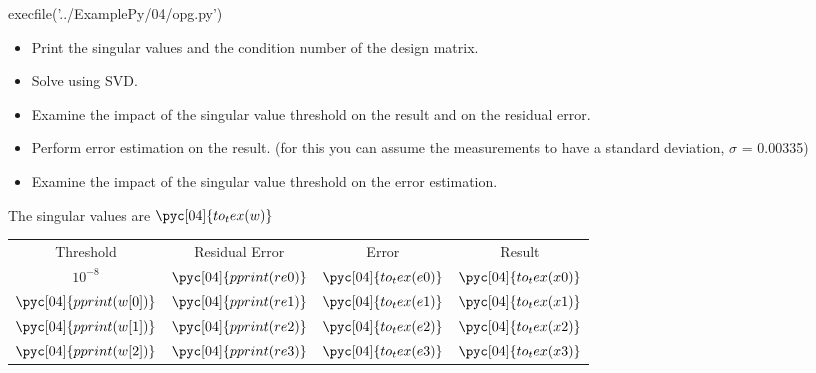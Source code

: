 \documentclass[../main.tex]{subfiles}
\begin{document}
\begin{pycode}[04]
execfile('../ExamplePy/04/opg.py')
\end{pycode}

\begin{itemize}
	\item  Print the singular values and the condition number of the design matrix.
	\item  Solve using SVD.
	\item  Examine the impact of the singular value threshold on the result and on the residual error.
	\item  Perform error estimation on the result. (for this you can assume the measurements to
		have a standard deviation, $\sigma$ = 0.00335)
	\item  Examine the impact of the singular value threshold on the error estimation.
\end{itemize}

The singular values are $\pyc[04]{to_tex(w)}$\\

\begin{tabular}{cccc}
	Threshold & Residual Error & Error & Result\\
	$10^{-8} $ & $\pyc[04]{pprint(re0)}$ & $\pyc[04]{to_tex(e0)}$ &  $\pyc[04]{to_tex(x0)}$\\
	$\pyc[04]{pprint(w[0])} $ & $\pyc[04]{pprint(re1)}$ & $\pyc[04]{to_tex(e1)}$ &  $\pyc[04]{to_tex(x1)}$\\
	$\pyc[04]{pprint(w[1])} $ & $\pyc[04]{pprint(re2)}$ & $\pyc[04]{to_tex(e2)}$  & $\pyc[04]{to_tex(x2)}$\\
	$\pyc[04]{pprint(w[2])} $ & $\pyc[04]{pprint(re3)}$ & $\pyc[04]{to_tex(e3)}$  & $\pyc[04]{to_tex(x3)}$\\
\end{tabular}

\inputminted{python}{../ExamplePy/04/opg.py}

	
\end{document}
